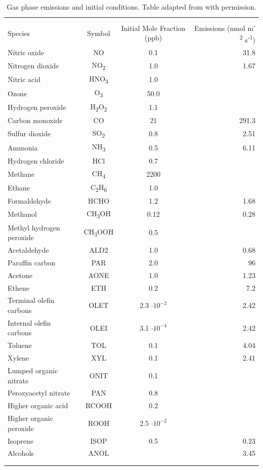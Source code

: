 \documentclass[acp]{copernicus}
\begin{document}
\begin{table}[!t]
\centering
\caption{Gas phase emissions and initial conditions. Table adapted from \citet{riemer_simulating_2009} with permission.}
\begin{tabular*}{\linewidth}{@{\extracolsep{\fill}} lccr}
\\[-2ex]\hline 
     \hline \\[-2ex] Species & Symbol & Initial Mole Fraction (ppb) & Emissions (nmol m\textsuperscript{-2} s\textsuperscript{-1}) \\
\midrule
Nitric oxide & NO & 0.1 & 31.8 \\
Nitrogen dioxide & NO\textsubscript{2} & 1.0 & 1.67 \\
Nitric acid & HNO\textsubscript{3} & 1.0 & \\
Ozone & O\textsubscript{3} & 50.0 & \\
Hydrogen peroxide & H\textsubscript{2}O\textsubscript{2} & 1.1 & \\
Carbon monoxide & CO & 21 & 291.3 \\
Sulfur dioxide & SO\textsubscript{2} & 0.8 & 2.51 \\
Ammonia & NH\textsubscript{3} & 0.5 & 6.11 \\
Hydrogen chloride & HCl & 0.7 & \\
Methane & CH\textsubscript{4} & 2200 & \\
Ethane & C\textsubscript{2}H\textsubscript{6} & 1.0 & \\
Formaldehyde & HCHO & 1.2 & 1.68 \\
Methanol & CH\textsubscript{3}OH & 0.12 & 0.28 \\
Methyl hydrogen peroxide & CH\textsubscript{3}OOH & 0.5 & \\
Acetaldehyde & ALD2 & 1.0 & 0.68 \\
Paraffin carbon & PAR & 2.0 & 96 \\
Acetone & AONE & 1.0 & 1.23 \\
Ethene & ETH & 0.2 & 7.2 \\
Terminal olefin carbons & OLET & 2.3 \(\cdot 10^{-2}\) & 2.42 \\
Internal olefin carbons & OLEI & 3.1 \(\cdot 10^{-4}\) & 2.42 \\
Toluene & TOL & 0.1 & 4.04 \\
Xylene & XYL & 0.1 & 2.41 \\
Lumped organic nitrate & ONIT & 0.1 & \\
Peroxyacetyl nitrate & PAN & 0.8 & \\
Higher organic acid & RCOOH & 0.2 & \\
Higher organic peroxide & ROOH & 2.5 \(\cdot 10^{-2}\) & \\
Isoprene & ISOP & 0.5 & 0.23 \\
Alcohols & ANOL & & 3.45 \\
\\[-2ex]\hline 
     \hline \\[-2ex]
\end{tabular*}
\label{table:gas_emiss_ics}
\end{table}
\end{document}
